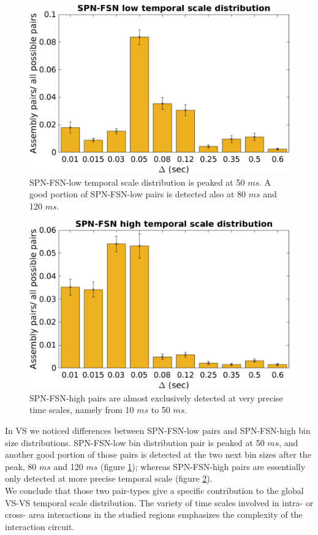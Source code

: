 \begin{figure}
    \centering
    \includegraphics[scale=0.5]{figures/SPN_FSNlow1.pdf}
    \caption{SPN-FSN-low temporal scale distribution is peaked at 50 $ms$. A good portion of SPN-FSN-low pairs is detected also at 80 $ms$ and 120 $ms$.}
    \label{fig:SPN_FSNlowBin}
\end{figure}
\begin{figure}
    \centering
    \includegraphics[scale=0.5]{figures/SPN_FSNhigh1.pdf}
    \caption{SPN-FSN-high pairs are almost exclusively detected at very precise time scales, namely from 10 $ms$ to 50 $ms$.}
    \label{fig:SPN_FSNhighBin}
\end{figure}
In VS we noticed differences between SPN-FSN-low pairs and SPN-FSN-high bin size distributions. SPN-FSN-low bin distribution pair is peaked at 50 $ms$, and another good portion of those pairs is detected at the two next bin sizes after the peak, 80 $ms$ and 120 $ms$ (figure \ref{fig:SPN_FSNlowBin}); whereas SPN-FSN-high pairs are essentially only detected at more precise temporal scale (figure \ref{fig:SPN_FSNhighBin}).\\We conclude that those two pair-types give a specific contribution to the global VS-VS temporal scale distribution. The variety of time scales involved in intra- or cross- area interactions in the studied regions emphasizes the complexity of the interaction circuit.
